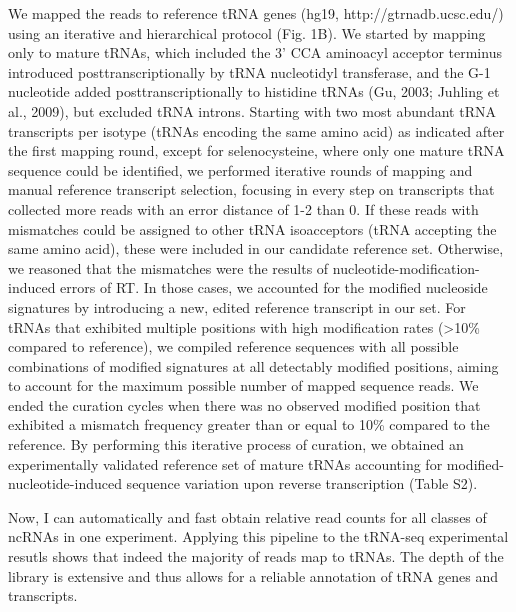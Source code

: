 \documentclass[12pt]{rockefeller}
\begin{document}
We mapped the reads to reference tRNA genes (hg19, http://gtrnadb.ucsc.edu/) using an iterative and hierarchical protocol (Fig. 1B). We started by mapping only to mature tRNAs, which included the 3’ CCA aminoacyl acceptor terminus introduced posttranscriptionally by tRNA nucleotidyl transferase, and the G-1 nucleotide added posttranscriptionally to histidine tRNAs (Gu, 2003; Juhling et al., 2009), but excluded tRNA introns. Starting with two most abundant tRNA transcripts per isotype (tRNAs encoding the same amino acid) as indicated after the first mapping round, except for selenocysteine, where only one mature tRNA sequence could be identified, we performed iterative rounds of mapping and manual reference transcript selection, focusing in every step on transcripts that collected more reads with an error distance of 1-2 than 0. If these reads with mismatches could be assigned to other tRNA isoacceptors (tRNA accepting the same amino acid), these were included in our candidate reference set. Otherwise, we reasoned that the mismatches were the results of nucleotide-modification-induced errors of RT. In those cases, we accounted for the modified nucleoside signatures by introducing a new, edited reference transcript in our set. For tRNAs that exhibited multiple positions with high modification rates (>10\% compared to reference), we compiled reference sequences with all possible combinations of modified signatures at all detectably modified positions, aiming to account for the maximum possible number of mapped sequence reads. We ended the curation cycles when there was no observed modified position that exhibited a mismatch frequency greater than or equal to 10\% compared to the reference. By performing this iterative process of curation, we obtained an experimentally validated reference set of mature tRNAs accounting for modified-nucleotide-induced sequence variation upon reverse transcription (Table S2).


Now, I can automatically and fast obtain relative read counts for all classes of ncRNAs in one experiment. 
Applying this pipeline to the tRNA-seq experimental resutls shows that indeed the majority of reads map to tRNAs. The depth of the library is extensive and thus allows for a reliable annotation of tRNA genes and transcripts. 
\end{document}
